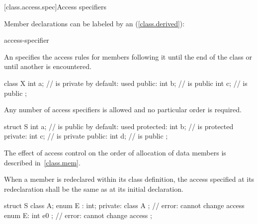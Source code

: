 [class.access.spec]{Access specifiers}%

\pnum
Member declarations can be labeled by an
(\ref{class.derived}):

\begin{ncsimplebnf}
access-specifier \terminal{:} 
\end{ncsimplebnf}

An
specifies the access rules for members following it
until the end of the class or until another
is encountered.
\begin{example}

\begin{codeblock}
class X {
  int a;            //  is private by default:  used
public:
  int b;            //  is public
  int c;            //  is public
};
\end{codeblock}
\end{example}

\pnum
Any number of access specifiers is allowed and no particular order is required.
\begin{example}

\begin{codeblock}
struct S {
  int a;            //  is public by default:  used
protected:
  int b;            //  is protected
private:
  int c;            //  is private
public:
  int d;            //  is public
};
\end{codeblock}
\end{example}

\pnum
\begin{note} The effect of access control on the order of allocation
of data members is described in~\ref{class.mem}.\end{note}

\pnum
When a member is redeclared within its class definition,
the access specified at its redeclaration shall
be the same as at its initial declaration.
\begin{example}

\begin{codeblock}
struct S {
  class A;
  enum E : int;
private:
  class A { };        // error: cannot change access
  enum E: int { e0 }; // error: cannot change access
};
\end{codeblock}
\end{example}

